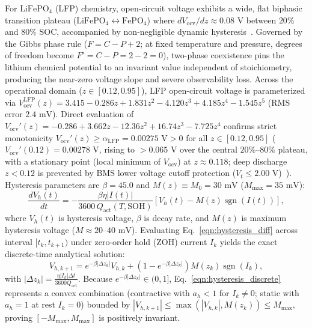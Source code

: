 \documentclass[preprint,12pt]{elsarticle}
\begin{document}
For $\text{LiFePO}_4$ (LFP) chemistry, open-circuit voltage exhibits a wide, flat biphasic transition plateau ($\text{LiFePO}_4 \leftrightarrow \text{FePO}_4$) where $d V_{\text{ocv}} / dz \approx 0.08\text{ V}$ between $20\%$ and $80\%$ SOC, accompanied by non-negligible dynamic hysteresis~\cite{Roscher2011hysteresis,Verbrugge2004hysteresis}. Governed by the Gibbs phase rule ($F = C - P + 2$; at fixed temperature and pressure, degrees of freedom become $F' = C - P = 2 - 2 = 0$), two-phase coexistence pins the lithium chemical potential to an invariant value independent of stoichiometry, producing the near-zero voltage slope and severe observability loss. Across the operational domain ($z \in [0.12, 0.95]$), LFP open-circuit voltage is parameterized via $V_{\text{ocv}}^{\text{LFP}}(z) = 3.415 - 0.286z + 1.831z^2 - 4.120z^3 + 4.185z^4 - 1.545z^5$ (RMS error $2.4\text{ mV}$). Direct evaluation of $V_{\text{ocv}}'(z) = -0.286 + 3.662z - 12.36z^2 + 16.74z^3 - 7.725z^4$ confirms strict monotonicity $V_{\text{ocv}}'(z) \ge \alpha_{\text{LFP}} = 0.00275\text{ V} > 0$ for all $z \in [0.12, 0.95]$ ($V_{\text{ocv}}'(0.12) = 0.00278\text{ V}$, rising to $>0.065\text{ V}$ over the central $20\%\text{--}80\%$ plateau, with a stationary point (local minimum of $V_{\text{ocv}}$) at $z \approx 0.118$; deep discharge $z < 0.12$ is prevented by BMS lower voltage cutoff protection ($V_t \le 2.00\text{ V}$)~\cite{He2011ecm}). Hysteresis parameters are $\beta = 45.0$ and $M(z) \equiv M_0 = 30\text{ mV}$ ($M_{\max} = 35\text{ mV}$):
\begin{equation}\label{eqn:hysteresis_diff}
\frac{d V_h(t)}{dt} = -\frac{\beta \eta |I(t)|}{3600\,Q_{\text{act}}(T, \text{SOH})} \left[ V_h(t) - M(z) \operatorname{sgn}(I(t)) \right],
\end{equation}
where $V_h(t)$ is hysteresis voltage, $\beta$ is decay rate, and $M(z)$ is maximum hysteresis voltage ($M \approx 20\text{--}40\text{ mV}$). Evaluating Eq.~\eqref{eqn:hysteresis_diff} across interval $[t_k, t_{k+1})$ under zero-order hold (ZOH) current $I_k$ yields the exact discrete-time analytical solution:
\begin{equation}\label{eqn:hysteresis_discrete}
V_{h,k+1} = e^{-\beta |\Delta z_k|} V_{h,k} + \left(1 - e^{-\beta |\Delta z_k|}\right) M(z_k) \operatorname{sgn}(I_k),
\end{equation}
with $|\Delta z_k| = \frac{\eta |I_k| \Delta t}{3600 Q_{\text{act}}}$. Because $e^{-\beta |\Delta z_k|} \in (0, 1]$, Eq.~\eqref{eqn:hysteresis_discrete} represents a convex combination (contractive with $a_h < 1$ for $I_k \ne 0$; static with $a_h = 1$ at rest $I_k = 0$) bounded by $|V_{h,k+1}| \le \max(|V_{h,k}|, M(z_k)) \le M_{\max}$, proving $[-M_{\max}, M_{\max}]$ is positively invariant.
\end{document}
